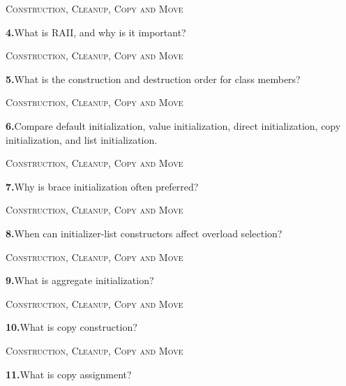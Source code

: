 \documentclass[11pt,a4paper]{article}
\newenvironment{questionblock}{%
  \begin{minipage}[t][0.455\textheight][t]{\textwidth}%
  \raggedright\small
}{%
  \vfill
  \end{minipage}%
}
\newcommand{\sectionlabel}[1]{\textsc{#1}\par\vspace{0.35em}}
\newcommand{\questionnumber}[1]{\textbf{#1.}\enspace}
\begin{document}
\begin{questionblock}
\sectionlabel{Construction, Cleanup, Copy and Move}
\questionnumber{4}What is RAII, and why is it important?\par
\end{questionblock}
\newpage
\begin{questionblock}
\sectionlabel{Construction, Cleanup, Copy and Move}
\questionnumber{5}What is the construction and destruction order for class members?\par
\end{questionblock}
\vspace*{0.04\textheight}
\begin{questionblock}
\sectionlabel{Construction, Cleanup, Copy and Move}
\questionnumber{6}Compare default initialization, value initialization, direct initialization, copy initialization, and list initialization.\par
\end{questionblock}
\newpage
\begin{questionblock}
\sectionlabel{Construction, Cleanup, Copy and Move}
\questionnumber{7}Why is brace initialization often preferred?\par
\end{questionblock}
\vspace*{0.04\textheight}
\begin{questionblock}
\sectionlabel{Construction, Cleanup, Copy and Move}
\questionnumber{8}When can initializer-list constructors affect overload selection?\par
\end{questionblock}
\newpage
\begin{questionblock}
\sectionlabel{Construction, Cleanup, Copy and Move}
\questionnumber{9}What is aggregate initialization?\par
\end{questionblock}
\vspace*{0.04\textheight}
\begin{questionblock}
\sectionlabel{Construction, Cleanup, Copy and Move}
\questionnumber{10}What is copy construction?\par
\end{questionblock}
\newpage
\begin{questionblock}
\sectionlabel{Construction, Cleanup, Copy and Move}
\questionnumber{11}What is copy assignment?\par
\end{questionblock}
\vspace*{0.04\textheight}
\end{document}
